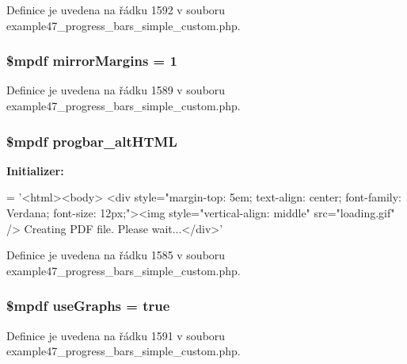 Definice je uvedena na řádku 1592 v souboru example47\-\_\-progress\-\_\-bars\-\_\-simple\-\_\-custom.\-php.

\hypertarget{example47__progress__bars__simple__custom_8php_a24c284cb7774410f65953584ea1fd9c1}{
\subsubsection[{mirror\-Margins}]{\setlength{\rightskip}{0pt plus 5cm}\$mpdf mirror\-Margins = 1}}\label{example47__progress__bars__simple__custom_8php_a24c284cb7774410f65953584ea1fd9c1}


Definice je uvedena na řádku 1589 v souboru example47\-\_\-progress\-\_\-bars\-\_\-simple\-\_\-custom.\-php.

\hypertarget{example47__progress__bars__simple__custom_8php_a26fa4148e931f73109914c61d46e796a}{
\subsubsection[{progbar\-\_\-alt\-H\-T\-M\-L}]{\setlength{\rightskip}{0pt plus 5cm}\$mpdf progbar\-\_\-alt\-H\-T\-M\-L}}\label{example47__progress__bars__simple__custom_8php_a26fa4148e931f73109914c61d46e796a}
{\bfseries Initializer\-:}
\begin{DoxyCode}
= \textcolor{stringliteral}{'<html><body>}
\textcolor{stringliteral}{    <div style="margin-top: 5em; text-align: center; font-family: Verdana; font-size: 12px;"><img
       style="vertical-align: middle" src="loading.gif" /> Creating PDF file. Please wait...</div>'}
\end{DoxyCode}


Definice je uvedena na řádku 1585 v souboru example47\-\_\-progress\-\_\-bars\-\_\-simple\-\_\-custom.\-php.

\hypertarget{example47__progress__bars__simple__custom_8php_a789abe3531b709632605a9c52e9ba0d9}{
\subsubsection[{use\-Graphs}]{\setlength{\rightskip}{0pt plus 5cm}\$mpdf use\-Graphs = true}}\label{example47__progress__bars__simple__custom_8php_a789abe3531b709632605a9c52e9ba0d9}


Definice je uvedena na řádku 1591 v souboru example47\-\_\-progress\-\_\-bars\-\_\-simple\-\_\-custom.\-php.

